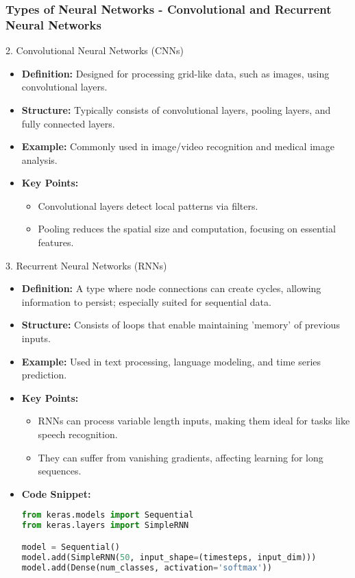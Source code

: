 \documentclass[aspectratio=169]{beamer}
\begin{document}
\begin{frame}[fragile]
    \frametitle{Types of Neural Networks - Convolutional and Recurrent Neural Networks}
    \begin{block}{2. Convolutional Neural Networks (CNNs)}
        \begin{itemize}
            \item \textbf{Definition:} Designed for processing grid-like data, such as images, using convolutional layers.
            \item \textbf{Structure:} Typically consists of convolutional layers, pooling layers, and fully connected layers.
            \item \textbf{Example:} Commonly used in image/video recognition and medical image analysis.
            \item \textbf{Key Points:}
            \begin{itemize}
                \item Convolutional layers detect local patterns via filters.
                \item Pooling reduces the spatial size and computation, focusing on essential features.
            \end{itemize}
        \end{itemize}
    \end{block}

    \begin{block}{3. Recurrent Neural Networks (RNNs)}
        \begin{itemize}
            \item \textbf{Definition:} A type where node connections can create cycles, allowing information to persist; especially suited for sequential data.
            \item \textbf{Structure:} Consists of loops that enable maintaining 'memory' of previous inputs.
            \item \textbf{Example:} Used in text processing, language modeling, and time series prediction.
            \item \textbf{Key Points:}
            \begin{itemize}
                \item RNNs can process variable length inputs, making them ideal for tasks like speech recognition.
                \item They can suffer from vanishing gradients, affecting learning for long sequences.
            \end{itemize}
            \item \textbf{Code Snippet:}
            \begin{lstlisting}[language=Python]
from keras.models import Sequential
from keras.layers import SimpleRNN

model = Sequential()
model.add(SimpleRNN(50, input_shape=(timesteps, input_dim)))
model.add(Dense(num_classes, activation='softmax'))
            \end{lstlisting}
        \end{itemize}
    \end{block}
\end{frame}
\end{document}
